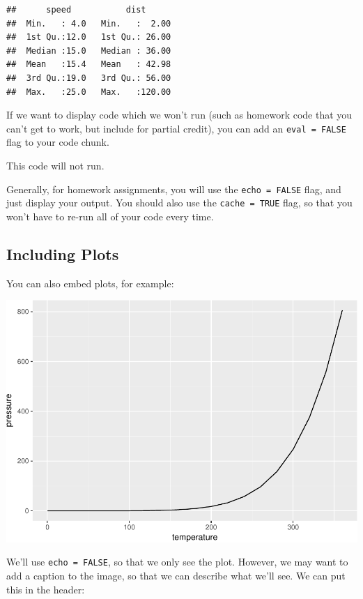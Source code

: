 \documentclass[]{article}
\newenvironment{Shaded}{\begin{snugshade}}{\end{snugshade}}
\newcommand{\NormalTok}[1]{{#1}}
\begin{document}
\begin{verbatim}
##      speed           dist       
##  Min.   : 4.0   Min.   :  2.00  
##  1st Qu.:12.0   1st Qu.: 26.00  
##  Median :15.0   Median : 36.00  
##  Mean   :15.4   Mean   : 42.98  
##  3rd Qu.:19.0   3rd Qu.: 56.00  
##  Max.   :25.0   Max.   :120.00
\end{verbatim}

If we want to display code which we won't run (such as homework code
that you can't get to work, but include for partial credit), you can add
an \texttt{eval\ =\ FALSE} flag to your code chunk.

\begin{Shaded}
\begin{Highlighting}[]
\NormalTok{This code will not run. }
\end{Highlighting}
\end{Shaded}

Generally, for homework assignments, you will use the
\texttt{echo\ =\ FALSE} flag, and just display your output. You should
also use the \texttt{cache\ =\ TRUE} flag, so that you won't have to
re-run all of your code every time.

\subsection{Including Plots}\label{including-plots}

You can also embed plots, for example:

\includegraphics{example_rmarkdown_files/figure-latex/pressure-1.pdf}

We'll use \texttt{echo\ =\ FALSE}, so that we only see the plot.
However, we may want to add a caption to the image, so that we can
describe what we'll see. We can put this in the header:
\end{document}
